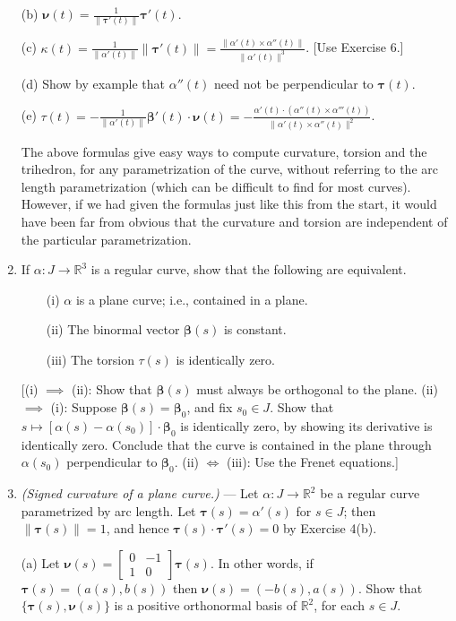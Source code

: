 \documentclass[leqno]{book}
\begin{document}
\begin{enumerate}
(b) $\boldsymbol\nu(t)=\frac{1}{\|\boldsymbol\tau'(t)\|}\boldsymbol\tau'(t)$.

(c) $\kappa(t)=\frac 1{\|\alpha'(t)\|}\|\boldsymbol\tau'(t)\|=\frac{\|\alpha'(t)\times\alpha''(t)\|}{\|\alpha'(t)\|^3}$.  [Use Exercise 6.]

(d) Show by example that $\alpha''(t)$ need not be perpendicular to $\boldsymbol\tau(t)$.

(e) $\tau(t)=-\frac 1{\|\alpha'(t)\|}\boldsymbol\beta'(t)\cdot\boldsymbol\nu(t)=-\frac{\alpha'(t)\cdot(\alpha''(t)\times\alpha'''(t))}{\|\alpha'(t)\times\alpha''(t)\|^2}$.

The above formulas give easy ways to compute curvature, torsion and the trihedron, for any parametrization of the curve, without referring to the arc length parametrization (which can be difficult to find for most curves).  However, if we had given the formulas just like this from the start, it would have been far from obvious that the curvature and torsion are independent of the particular parametrization.

\item If $\alpha:J\to\mathbb R^3$ is a regular curve, show that the following are equivalent.

~~~~(i) $\alpha$ is a plane curve; i.e., contained in a plane.

~~~~(ii) The binormal vector $\boldsymbol\beta(s)$ is constant.

~~~~(iii) The torsion $\tau(s)$ is identically zero.

[(i) $\implies$ (ii): Show that $\boldsymbol\beta(s)$ must always be orthogonal to the plane. (ii) $\implies$ (i): Suppose $\boldsymbol\beta(s)=\boldsymbol\beta_0$, and fix $s_0\in J$.  Show that $s\mapsto[\alpha(s)-\alpha(s_0)]\cdot\boldsymbol\beta_0$ is identically zero, by showing its derivative is identically zero.  Conclude that the curve is contained in the plane through $\alpha(s_0)$ perpendicular to $\boldsymbol\beta_0$. (ii) $\iff$ (iii): Use the Frenet equations.]

\item\emph{(Signed curvature of a plane curve.)} \---- Let $\alpha:J\to\mathbb R^2$ be a regular curve parametrized by arc length.  Let $\boldsymbol\tau(s)=\alpha'(s)$ for $s\in J$; then $\|\boldsymbol\tau(s)\|=1$, and hence $\boldsymbol\tau(s)\cdot\boldsymbol\tau'(s)=0$ by Exercise 4(b).

(a) Let $\boldsymbol\nu(s)=\begin{bmatrix}0&-1\\1&0\end{bmatrix}\boldsymbol\tau(s)$.  In other words, if $\boldsymbol\tau(s)=(a(s),b(s))$ then $\boldsymbol\nu(s)=(-b(s),a(s))$.  Show that $\{\boldsymbol\tau(s),\boldsymbol\nu(s)\}$ is a positive orthonormal basis of $\mathbb R^2$, for each $s\in J$.


\end{enumerate}
\end{document}
